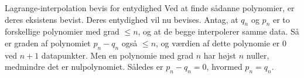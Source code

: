 \begin{frame}{Lagrange-interpolation bevis for entydighed}
    Ved at finde sådanne polynomier, er deres eksistens bevist. 
    Deres entydighed vil nu bevises. 
    Antag, at $q_n$ og $p_n$ er to forskellige polynomier med grad $\leq n$, og at de begge interpolerer samme data. 
    Så er graden af polynomiet $p_n - q_n$ også $\leq n$, og værdien af dette polynomie er $0$ ved $n+1$ datapunkter. 
    Men en polynomie med grad $n$ har højst $n$ nuller, medmindre det er nulpolynomiet. 
    Således er $p_n - q_n = 0$, hvormed $p_n = q_n$. 
\end{frame}


